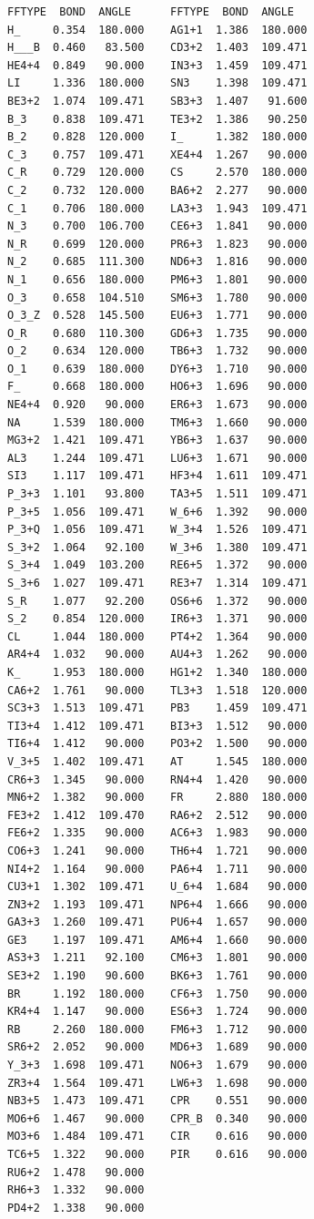 \documentclass[final,12pt]{article}
\begin{document}
{{{{{{\scriptsize
\begin{verbatim}
FFTYPE  BOND  ANGLE      FFTYPE  BOND  ANGLE
H_     0.354  180.000    AG1+1  1.386  180.000
H___B  0.460   83.500 	 CD3+2  1.403  109.471
HE4+4  0.849   90.000 	 IN3+3  1.459  109.471
LI     1.336  180.000 	 SN3    1.398  109.471
BE3+2  1.074  109.471 	 SB3+3  1.407   91.600
B_3    0.838  109.471 	 TE3+2  1.386   90.250
B_2    0.828  120.000 	 I_     1.382  180.000
C_3    0.757  109.471 	 XE4+4  1.267   90.000
C_R    0.729  120.000 	 CS     2.570  180.000
C_2    0.732  120.000 	 BA6+2  2.277   90.000
C_1    0.706  180.000 	 LA3+3  1.943  109.471
N_3    0.700  106.700 	 CE6+3  1.841   90.000
N_R    0.699  120.000 	 PR6+3  1.823   90.000
N_2    0.685  111.300 	 ND6+3  1.816   90.000
N_1    0.656  180.000 	 PM6+3  1.801   90.000
O_3    0.658  104.510 	 SM6+3  1.780   90.000
O_3_Z  0.528  145.500 	 EU6+3  1.771   90.000
O_R    0.680  110.300 	 GD6+3  1.735   90.000
O_2    0.634  120.000 	 TB6+3  1.732   90.000
O_1    0.639  180.000 	 DY6+3  1.710   90.000
F_     0.668  180.000 	 HO6+3  1.696   90.000
NE4+4  0.920   90.000 	 ER6+3  1.673   90.000
NA     1.539  180.000 	 TM6+3  1.660   90.000
MG3+2  1.421  109.471 	 YB6+3  1.637   90.000
AL3    1.244  109.471 	 LU6+3  1.671   90.000
SI3    1.117  109.471 	 HF3+4  1.611  109.471
P_3+3  1.101   93.800 	 TA3+5  1.511  109.471
P_3+5  1.056  109.471 	 W_6+6  1.392   90.000
P_3+Q  1.056  109.471 	 W_3+4  1.526  109.471
S_3+2  1.064   92.100 	 W_3+6  1.380  109.471
S_3+4  1.049  103.200 	 RE6+5  1.372   90.000
S_3+6  1.027  109.471 	 RE3+7  1.314  109.471
S_R    1.077   92.200 	 OS6+6  1.372   90.000
S_2    0.854  120.000 	 IR6+3  1.371   90.000
CL     1.044  180.000 	 PT4+2  1.364   90.000
AR4+4  1.032   90.000 	 AU4+3  1.262   90.000
K_     1.953  180.000 	 HG1+2  1.340  180.000
CA6+2  1.761   90.000 	 TL3+3  1.518  120.000
SC3+3  1.513  109.471 	 PB3    1.459  109.471
TI3+4  1.412  109.471 	 BI3+3  1.512   90.000
TI6+4  1.412   90.000 	 PO3+2  1.500   90.000
V_3+5  1.402  109.471 	 AT     1.545  180.000
CR6+3  1.345   90.000 	 RN4+4  1.420   90.000
MN6+2  1.382   90.000 	 FR     2.880  180.000
FE3+2  1.412  109.470 	 RA6+2  2.512   90.000
FE6+2  1.335   90.000 	 AC6+3  1.983   90.000
CO6+3  1.241   90.000 	 TH6+4  1.721   90.000
NI4+2  1.164   90.000 	 PA6+4  1.711   90.000
CU3+1  1.302  109.471 	 U_6+4  1.684   90.000
ZN3+2  1.193  109.471 	 NP6+4  1.666   90.000
GA3+3  1.260  109.471 	 PU6+4  1.657   90.000
GE3    1.197  109.471 	 AM6+4  1.660   90.000
AS3+3  1.211   92.100 	 CM6+3  1.801   90.000
SE3+2  1.190   90.600 	 BK6+3  1.761   90.000
BR     1.192  180.000 	 CF6+3  1.750   90.000
KR4+4  1.147   90.000 	 ES6+3  1.724   90.000
RB     2.260  180.000 	 FM6+3  1.712   90.000
SR6+2  2.052   90.000 	 MD6+3  1.689   90.000
Y_3+3  1.698  109.471 	 NO6+3  1.679   90.000
ZR3+4  1.564  109.471 	 LW6+3  1.698   90.000
NB3+5  1.473  109.471 	 CPR    0.551   90.000
MO6+6  1.467   90.000 	 CPR_B  0.340   90.000
MO3+6  1.484  109.471 	 CIR    0.616   90.000
TC6+5  1.322   90.000 	 PIR    0.616   90.000
RU6+2  1.478   90.000 
RH6+3  1.332   90.000 
PD4+2  1.338   90.000 
\end{verbatim}
\normalsize

}}}}}}
\end{document}
